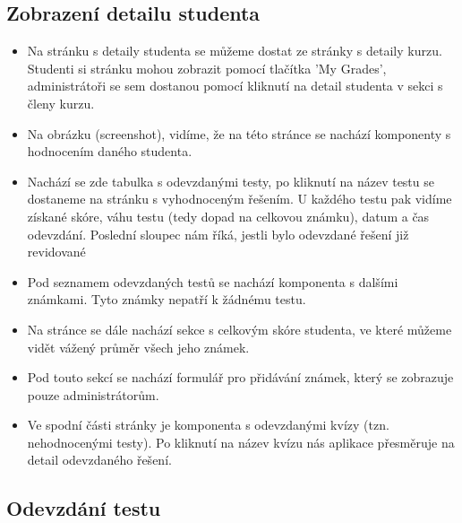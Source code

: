 \subsection{Zobrazení detailu studenta}

\begin{itemize}
	\item Na stránku s detaily studenta se můžeme dostat ze stránky s detaily kurzu. Studenti si stránku mohou zobrazit pomocí tlačítka 'My Grades', administrátoři se sem dostanou pomocí kliknutí na detail studenta v sekci s členy kurzu.
	\item Na obrázku (screenshot), vidíme, že na této stránce se nachází komponenty s hodnocením daného studenta. 
	\item Nachází se zde tabulka s odevzdanými testy, po kliknutí na název testu se dostaneme na stránku s vyhodnoceným řešením. U každého testu pak vidíme získané skóre, váhu testu (tedy dopad na celkovou známku), datum a čas odevzdání. Poslední sloupec nám říká, jestli bylo odevzdané řešení již revidované
	\item Pod seznamem odevzdaných testů se nachází komponenta s dalšími známkami. Tyto známky nepatří k žádnému testu. 
	\item Na stránce se dále nachází sekce s celkovým skóre studenta, ve které můžeme vidět vážený průměr všech jeho známek.
	\item Pod touto sekcí se nachází formulář pro přidávání známek, který se zobrazuje pouze administrátorům.
	\item Ve spodní části stránky je komponenta s odevzdanými kvízy (tzn. nehodnocenými testy). Po kliknutí na název kvízu nás aplikace přesměruje na detail odevzdaného řešení.
\end{itemize}

\subsection{Odevzdání testu}

